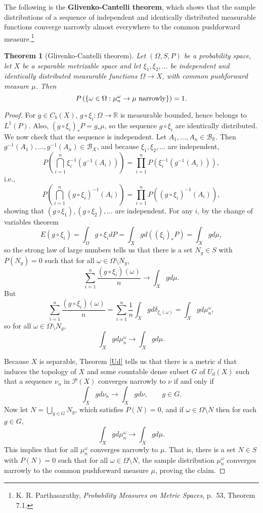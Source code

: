\documentclass{article}
\newtheorem{theorem}{Theorem}
\theoremstyle{definition}
\begin{document}
The following is the \textbf{Glivenko-Cantelli theorem}, which shows that
the sample distributions of a sequence of independent and identically
distributed measurable functions converge narrowly almost everywhere
to the common pushforward measure.\footnote{K. R. Parthasarathy,
{\em Probability Measures on Metric Spaces}, p.~53, Theorem 7.1.}

\begin{theorem}[Glivenko-Cantelli theorem]
Let $(\Omega,S,P)$ be a probability space,
let $X$ be a separable metrizable space and 
let  $\xi_1,\xi_2,\ldots$ be independent and identically distributed measurable functions
$\Omega \to X$, with common pushforward measure $\mu$. Then
\[
P\left( \left\{ \omega \in \Omega: \textnormal{$\mu_n^\omega \to \mu$ narrowly} \right\} \right) = 1.
\]
\end{theorem}
\begin{proof}
For $g \in C_b(X)$, $g \circ \xi_i:\Omega \to \mathbb{R}$ is measurable bounded, hence belongs to $L^1(P)$. Also, 
$(g \circ \xi_i)_* P = g_* \mu$, so the sequence $g \circ \xi_i$ are identically distributed. We now check that the sequence is independent.
Let $A_1,\ldots,A_n \in \mathscr{B}_{\mathbb{R}}$. Then $g^{-1}(A_1),\ldots,g^{-1}(A_n) \in \mathscr{B}_X$, and because
$\xi_1,\xi_2,\ldots$ are independent,
\[
P\left( \bigcap_{i=1}^n \xi_i^{-1}(g^{-1}(A_i)) \right) = \prod_{i=1}^n P(\xi_i^{-1}(g^{-1}(A_i))),
\]
i.e.,
\[
P\left( \bigcap_{i=1}^n (g \circ \xi_i)^{-1}(A_i) \right) = \prod_{i=1}^n P((g \circ \xi_i)^{-1}(A_i)),
\]
showing that  $(g \circ \xi_1),(g \circ \xi_2),\ldots$ are independent. 
For any $i$, by the change of variables theorem
\[
E( g \circ \xi_i) = \int_\Omega g \circ \xi_i dP = \int_X g d((\xi_i)_* P) = 
\int_X g d\mu,
\]
so the strong law of large numbers tells us that there is a set $N_g \in S$ with $P(N_g)=0$ such that
for all $\omega \in \Omega \setminus N_g$, 
\[
\sum_{i=1}^n \frac{(g \circ \xi_i)(\omega)}{n} \to \int_X g d\mu.
\]
But
\[
\sum_{i=1}^n \frac{(g \circ \xi_i)(\omega)}{n} = 
\sum_{i=1}^n \frac{1}{n} \int_X g d\delta_{\xi_i(\omega)}
=\int_X g d\mu_n^\omega,
\]
so for all $\omega \in \Omega \setminus N_g$,
\[
\int_X g d\mu_n^\omega \to \int_X g d\mu.
\]

Because $X$ is separable,
Theorem \ref{Ud} tells us that there is a metric $d$ that induces the topology of $X$ and some countable dense subset $G$
of $U_d(X)$ such that a sequence $\nu_n$ in $\mathscr{P}(X)$ converges narrowly to $\nu$  if and only if 
\[
\int_X g d\nu_n \to \int_X g d\nu, \qquad g \in G.
\]
Now let $N=\bigcup_{g \in G} N_g$, which satisfies $P(N)=0$, and if $\omega \in \Omega \setminus N$ then
for each $g \in G$,
\[
\int_X g d\mu_n^\omega \to \int_X g d\mu.
\]
This implies that for all $\mu_n^\omega$ converges narrowly to $\mu$. That is,
there is a set $N \in S$ with $P(N)=0$ such that for all $\omega \in \Omega \setminus N$, 
the sample distribution $\mu_n^\omega$ converges narrowly to the common pushforward measure 
$\mu$, proving the claim.
\end{proof}
\end{document}
